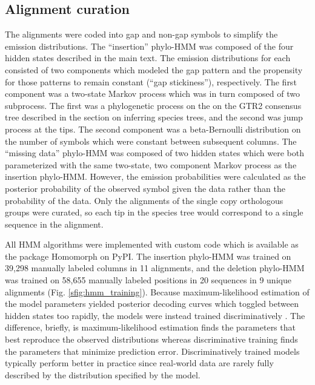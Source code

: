\documentclass[10pt,letterpaper]{article}
\begin{document}
\subsection*{Alignment curation}
The alignments were coded into gap and non-gap symbols to simplify the emission distributions. The ``insertion'' phylo-HMM was composed of the four hidden states described in the main text. The emission distributions for each consisted of two components which modeled the gap pattern and the propensity for those patterns to remain constant (``gap stickiness''), respectively. The first component was a two-state Markov process which was in turn composed of two subprocess. The first was a phylogenetic process on the on the GTR2 consensus tree described in the section on inferring species trees, and the second was jump process at the tips. The second component was a beta-Bernoulli distribution on the number of symbols which were constant between subsequent columns. The ``missing data'' phylo-HMM was composed of two hidden states which were both parameterized with the same two-state, two component Markov process as the insertion phylo-HMM. However, the emission probabilities were calculated as the posterior probability of the observed symbol given the data rather than the probability of the data. Only the alignments of the single copy orthologous groups were curated, so each tip in the species tree would correspond to a single sequence in the alignment.

All HMM algorithms were implemented with custom code which is available as the package Homomorph on PyPI. The insertion phylo-HMM was trained on 39,298 manually labeled columns in 11 alignments, and the deletion phylo-HMM was trained on 58,655 manually labeled positions in 20 sequences in 9 unique alignments (Fig. \ref{sfig:hmm_training}). Because maximum-likelihood estimation of the model parameters yielded posterior decoding curves which toggled between hidden states too rapidly, the models were instead trained discriminatively \cite{Krogh1999}. The difference, briefly, is maximum-likelihood estimation finds the parameters that best reproduce the observed distributions whereas discriminative training finds the parameters that minimize prediction error. Discriminatively trained models typically perform better in practice since real-world data are rarely fully described by the distribution specified by the model.
\end{document}
